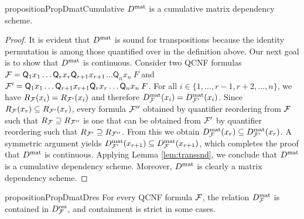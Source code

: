 \documentclass{llncs}
\newcommand{\longversion}[1]{#1}
\newcommand{\shortversion}[1]{}
\newcommand{\Dres}{D^{\text{\normalfont res}}}
\newcommand{\Dmat}{D^{\text{\normalfont mat}}}
\begin{document}
\begin{restatable}{proposition}{PropDmatCumulative}\label{prop:dmatcumulative}\shortversion{\textup{($\star$)}}
$\Dmat$ is a cumulative matrix dependency scheme.
\end{restatable}
\longversion{\longversion{\begin{sloppypar}}
\begin{proof}
  It is evident that $\Dmat$ is sound for transpositions because the
  identity permutation is among those quantified over in the definition
  above. Our next goal is to show that $\Dmat$ is continuous. Consider two
  QCNF formulas $\mathcal{F} = \mathsf{Q}_1 x_1 \dots \mathsf{Q}_r x_r
  \mathsf{Q}_{r+1} x_{r+1} $\hskip 0pt$\dots \mathsf{Q}_n x_n\:F$ and $\mathcal{F}' =
  \mathsf{Q}_1 x_1 \dots \mathsf{Q}_{r+1} x_{r+1} \mathsf{Q}_r x_r \dots
  \mathsf{Q}_n x_n\:F$. For all $i \in \{1, \dots,r-1,r+2,\dots, n\}$, we have
  $R_{\mathcal{F}}(x_i) = R_{\mathcal{F}'}(x_i)$ and therefore $\Dmat_{\FFF}(x_i) =
  \Dmat_{\FFF'}(x_i)$. Since $R_{\mathcal{F}}(x_r) \subseteq R_{\mathcal{F}'}(x_r)$, every
  formula $\mathcal{F}''$ obtained by quantifier reordering from $\mathcal{F}$ such that
  $R_{\mathcal{F}} \supseteq R_{\mathcal{F}''}$ is one that can be obtained from $\mathcal{F}'$ by
  quantifier reordering such that $R_{\mathcal{F}'} \supseteq R_{\mathcal{F}''}$. From this
  we obtain $\Dmat_{\FFF}(x_r) \subseteq \Dmat_{\FFF'}(x_r)$. A symmetric
  argument yields $\Dmat_{\FFF'}(x_{r+1}) \subseteq
  \Dmat_{\FFF}(x_{r+1})$, which completes the proof that $\Dmat$ is
  continuous. Applying Lemma \ref{lem:transsnd}, we conclude that $\Dmat$ is
  a cumulative dependency scheme. Moreover, $\Dmat$ is clearly a matrix
  dependency scheme.
\end{proof}
\longversion{\end{sloppypar}}
 }
\begin{restatable}{proposition}{PropDmatDres}\label{prop:resdepcontained}\shortversion{\textup{($\star$)}}
  For every QCNF formula $\mathcal{F}$, the relation $\Dmat_{\FFF}$ is contained in
  $\Dres_{\FFF}$, and containment is strict in some cases.
\end{restatable}
\end{document}
